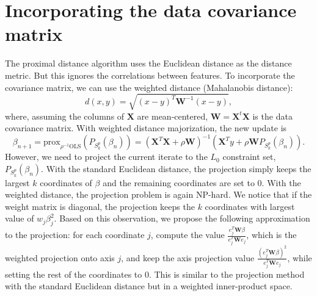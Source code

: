 \section{Incorporating the data covariance matrix}
The proximal distance algorithm uses the Euclidean distance as the distance metric. But this ignores the correlations between features. To incorporate the covariance matrix, we can use the weighted distance (Mahalanobis distance):
\[
d(x,y)=\sqrt{(x-y)^T\bm{W}^{-1}(x-y)},
\]
where, assuming the columns of $\bm{X}$ are mean-centered, $\bm{W}=\bm{X}^t\bm{X}$ is the data covariance matrix. With weighted distance majorization, the new update is 
\begin{equation}
    \beta_{n+1}=\text{prox}_{\rho^{-1}\text{OLS}}(P_{S_k^p}(\beta_n))=(\bm{X}^T\bm{X}+\rho\bm{W})^{-1}(\bm{X}^Ty+\rho\bm{W} P_{S_k^p}(\beta_n)).
\end{equation}
However, we need to project the current iterate to the $L_0$ constraint set, $P_{S_k^p}(\beta_n)$. With the standard Euclidean distance, the projection simply keeps the largest $k$ coordinates of $\beta$ and the remaining coordinates are set to 0. With the weighted distance, the projection problem is again NP-hard. We notice that if the weight matrix is diagonal, the projection keeps the $k$ coordinates with largest value of $w_j\beta_j^2$. Based on this observation, we propose the following approximation to the projection: for each coordinate $j$, compute the value $\frac{e_j^T\bm{W}\beta}{e_j^T\bm{W}e_j}$, which is the weighted projection onto axis $j$, and keep the axis projection value $\frac{(e_j^T\bm{W}\beta)^2}{e_j^T\bm{W}e_j}$, while setting the  rest of the coordinates to 0. This is similar to the projection method with the standard Euclidean distance but in a weighted inner-product space. 

